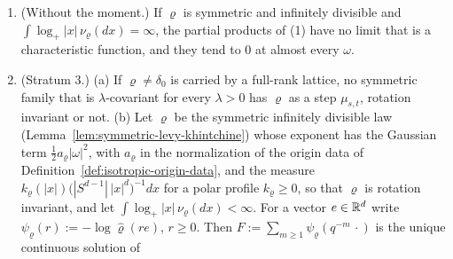 \begin{proposition}
\begin{enumerate}
$\mu'_{s,t} = \mu_{g(s),g(t)}$ for all $0 \le s \le t$ with $g \in \mathcal{G}_q$ and $g(0) := 0$,
iff the data $D_\varrho := (A_\varrho, \nu_\varrho)$ span an extreme ray of the cone of the data
$(A, \nu)$, $A$ positive semidefinite and $\nu$ a symmetric \Levy{} measure; this is the case iff
$\nu_\varrho = 0$ and $A_\varrho$ has rank one, or $A_\varrho = 0$ and
$\nu_\varrho = c(\delta_x + \delta_{-x})$ with $c > 0$ and $x \ne 0$. If $\varrho$ is rotation
invariant, any two isotropic families with this ladder are relabellings of each other iff
$D_\varrho$ spans an extreme ray of the cone of the data invariant under $\Orth(d)$; this is the
case iff $\nu_\varrho = 0$, or $A_\varrho = 0$ and $\nu_\varrho = c\,\sigma_r$ with $c, r > 0$ and
$\sigma_r$ the uniform probability on the sphere $\{|x| = r\}$. In particular, when $\nu_\varrho$ is
the sum of two nonzero symmetric parts carried by disjoint sets, two families with this ladder are
not relabellings of each other, and when $\varrho$ and both parts are rotation invariant, two
isotropic families with this ladder are not.
\item (Without the moment.) If $\varrho$ is symmetric and infinitely divisible and
$\int\log_+|x|\,\nu_\varrho(dx) = \infty$, the partial products of (1) have no limit that is a
characteristic function, and they tend to $0$ at almost every $\omega$.
\item (Stratum 3.) (a) If $\varrho \ne \delta_0$ is carried by a full-rank lattice, no symmetric
family that is $\lambda$-covariant for every $\lambda > 0$ has $\varrho$ as a step $\mu_{s,t}$,
rotation invariant or not. (b) Let $\varrho$ be the symmetric infinitely divisible law
(Lemma~\ref{lem:symmetric-levy-khintchine}) whose exponent has the Gaussian term $\tfrac12a_\varrho|\omega|^2$, with $a_\varrho$ in the normalization of the origin data of Definition~\ref{def:isotropic-origin-data}, and the \Levy{} measure
$k_\varrho(|x|)\bigl(|S^{d-1}|\,|x|^d\bigr)^{-1}dx$ for a polar profile $k_\varrho \ge 0$, so that
$\varrho$ is rotation invariant, and let $\int\log_+|x|\,\nu_\varrho(dx) < \infty$. For a vector
$e \in \mathbb{R}^d$ write $\psi_\varrho(r) := -\log\widehat\varrho(re)$, $r \ge 0$. Then
$F := \sum_{m \ge 1}\psi_\varrho(q^{-m}\,\cdot)$ is the unique continuous solution of

\end{enumerate}
\end{proposition}
